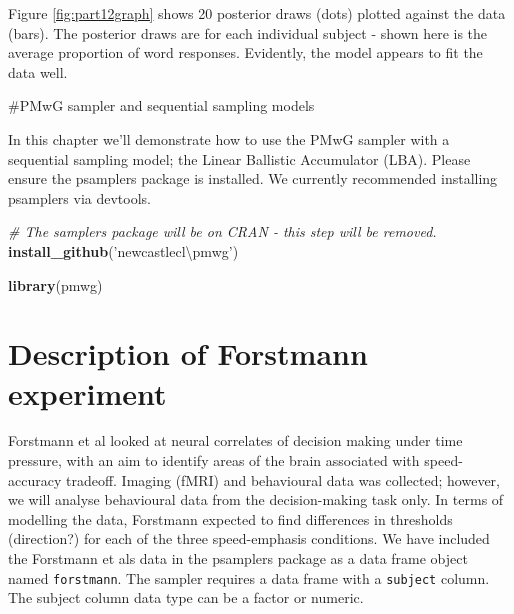 \documentclass[]{book}
\newenvironment{Shaded}{\begin{snugshade}}{\end{snugshade}}
\newcommand{\CommentTok}[1]{\textcolor[rgb]{0.56,0.35,0.01}{\textit{#1}}}
\newcommand{\KeywordTok}[1]{\textcolor[rgb]{0.13,0.29,0.53}{\textbf{#1}}}
\newcommand{\NormalTok}[1]{#1}
\newcommand{\StringTok}[1]{\textcolor[rgb]{0.31,0.60,0.02}{#1}}
\begin{document}
Figure \ref{fig:part12graph} shows 20 posterior draws (dots) plotted against the data (bars). The posterior draws are for each individual subject - shown here is the average proportion of word responses. Evidently, the model appears to fit the data well.

\#PMwG sampler and sequential sampling models

In this chapter we'll demonstrate how to use the PMwG sampler with a sequential sampling model; the Linear Ballistic Accumulator (LBA).
Please ensure the psamplers package is installed. We currently recommended installing psamplers via devtools.

\begin{Shaded}
\begin{Highlighting}[]
\CommentTok{# The samplers package will be on CRAN - this step will be removed.}
\KeywordTok{install_github}\NormalTok{(}\StringTok{'newcastlecl\textbackslash{}pmwg'}\NormalTok{)}
\end{Highlighting}
\end{Shaded}

\begin{Shaded}
\begin{Highlighting}[]
\KeywordTok{library}\NormalTok{(pmwg)}
\end{Highlighting}
\end{Shaded}

\hypertarget{description-of-forstmann-experiment}{%
\section{Description of Forstmann experiment}\label{description-of-forstmann-experiment}}

Forstmann et al looked at neural correlates of decision making under time pressure, with an aim to identify areas of the brain associated with speed-accuracy tradeoff. Imaging (fMRI) and behavioural data was collected; however, we will analyse behavioural data from the decision-making task only. In terms of modelling the data, Forstmann expected to find differences in thresholds (direction?) for each of the three speed-emphasis conditions. We have included the Forstmann et als data in the psamplers package as a data frame object named \texttt{forstmann}. The sampler requires a data frame with a \texttt{subject} column. The subject column data type can be a factor or numeric.
\end{document}
